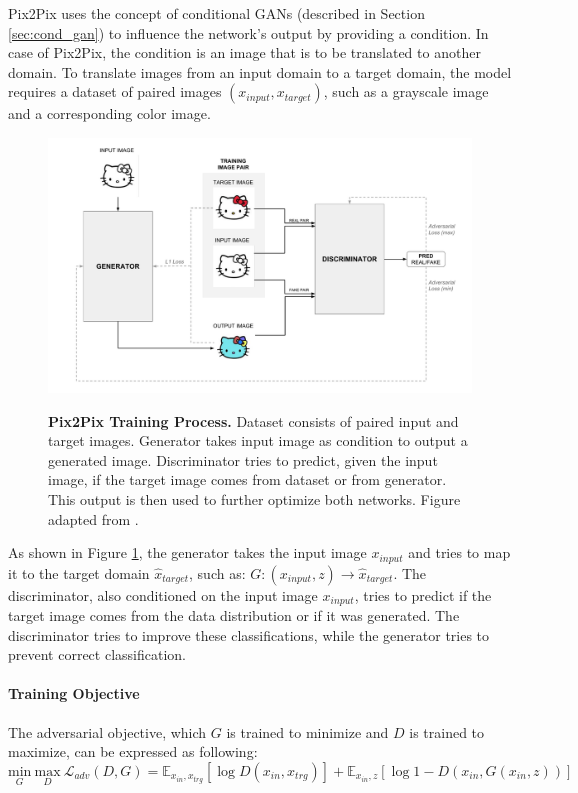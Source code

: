 \documentclass[12pt]{report}
\begin{document}
Pix2Pix uses the concept of conditional GANs \cite{mirza_conditional_2014} (described in Section \ref{sec:cond_gan}) to influence the network's output by providing a condition. In case of Pix2Pix, the condition is an image that is to be translated to another domain. To translate images from an input domain to a target domain, the model requires a dataset of paired images $(x_{input}, x_{target})$, such as a grayscale image and a corresponding color image. 


\begin{figure}[h]
\centering
{\includegraphics[width=\linewidth]{03_analysis/gans/pix2pix}}
\caption{\label{fig:pix2pix} \textbf{Pix2Pix Training Process.} Dataset consists of paired input and target images. Generator takes input image as condition to output a generated image. Discriminator tries to predict, given the input image, if the target image comes from dataset or from generator. This output is then used to further optimize both networks. Figure adapted from \cite{hesse_image--image_nodate-1}.}
\end{figure}

As shown in Figure \ref{fig:pix2pix}, the generator takes the input image $x_{input}$ and tries to map it to the target domain $\hat{x}_{target}$, such as: $G: (x_{input}, z) \rightarrow \hat{x}_{target}$. The discriminator, also conditioned on the input image $x_{input}$, tries to predict if the target image comes from the data distribution or if it was generated. The discriminator tries to improve these classifications, while the generator tries to prevent correct classification.


\paragraph{Training Objective}
The adversarial objective, which $G$ is trained to minimize and $D$ is trained to maximize, can be expressed as following:
\begin{equation}
\underset{G}{\mathrm{min}} \ \underset{D}{\mathrm{max}} \ \mathcal{L}_{adv}(D,G) = \mathbb{E}_{x_{in},x_{trg}}[\log D(x_{in},x_{trg})] + \mathbb{E}_{x_{in},z}[\log 1 - D(x_{in}, G(x_{in},z))]
\label{eq:pix2pix_minimax_cond}
\end{equation}
\end{document}

